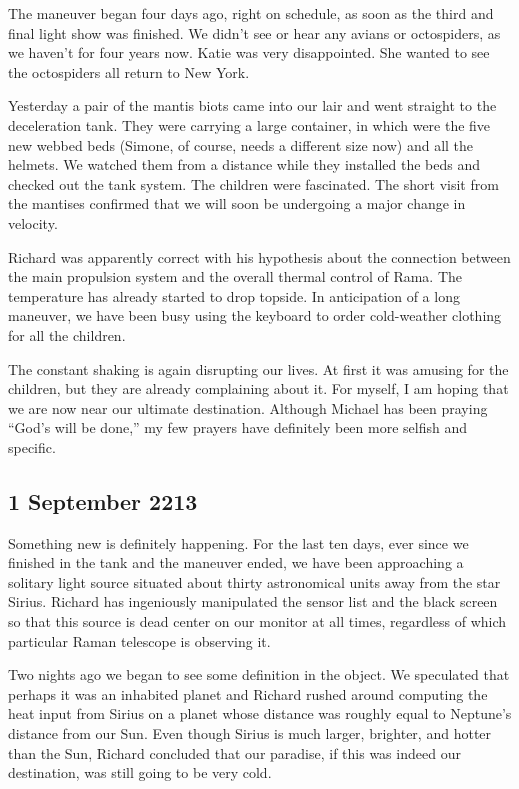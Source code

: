 \documentclass[]{article}
\begin{document}
{The maneuver began four days ago, right on schedule, as soon as the third and final light show was finished.  We didn’t see or hear any avians or octospiders, as we haven’t for four years now.  Katie was very disappointed.  She wanted to see the octospiders all return to New York.

Yesterday a pair of the mantis biots came into our lair and went straight to the deceleration tank.  They were carrying a large container, in which were the five new webbed beds (Simone, of course, needs a different size now) and all the helmets.  We watched them from a distance while they installed the beds and checked out the tank system.  The children were fascinated.  The short visit from the mantises confirmed that we will soon be undergoing a major change in velocity.

Richard was apparently correct with his hypothesis about the connection between the main propulsion system and the overall thermal control of Rama.  The temperature has already started to drop topside.  In anticipation of a long maneuver, we have been busy using the keyboard to order cold-weather clothing for all the children.

The constant shaking is again disrupting our lives.  At first it was amusing for the children, but they are already complaining about it.  For myself, I am hoping that we are now near our ultimate destination.  Although Michael has been praying “God’s will be done,” my few prayers have definitely been more selfish and specific.

\subsection*{1 September 2213}

Something new is definitely happening.  For the last ten days, ever since we finished in the tank and the maneuver ended, we have been approaching a solitary light source situated about thirty astronomical units away from the star Sirius.  Richard has ingeniously manipulated the sensor list and the black screen so that this source is dead center on our monitor at all times, regardless of which particular Raman telescope is observing it.

Two nights ago we began to see some definition in the object.  We speculated that perhaps it was an inhabited planet and Richard rushed around computing the heat input from Sirius on a planet whose distance was roughly equal to Neptune’s distance from our Sun.  Even though Sirius is much larger, brighter, and hotter than the Sun, Richard concluded that our paradise, if this was indeed our destination, was still going to be very cold.

}
\end{document}
